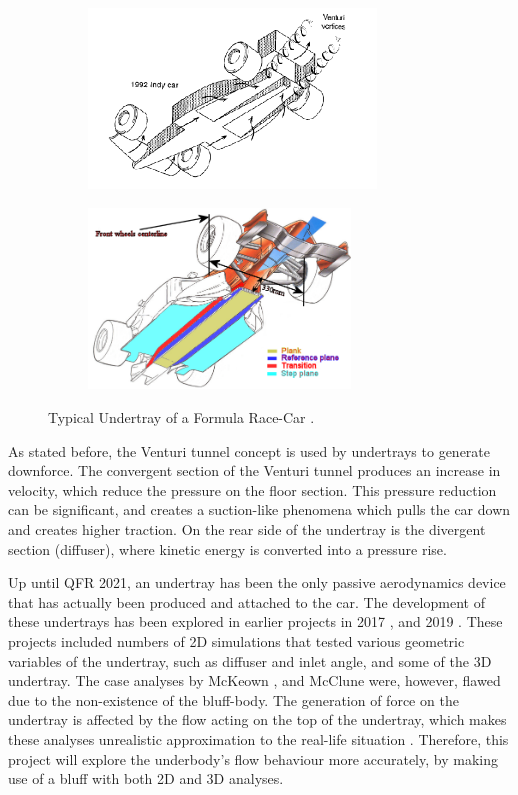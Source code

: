 \begin{figure}[!ht]
\begin{center}
%    
  \begin{subfigure}[b]{0.4\textwidth}
    \includegraphics[height=4.8cm]{Figures/underbody.PNG}
  \end{subfigure}
  \begin{subfigure}[b]{0.4\textwidth}
    \includegraphics[height=4.8cm]{Figures/undertray_f1.png}
  \end{subfigure}
%  
  \caption{Typical Undertray of a Formula Race-Car \cite{Katz1995RaceSpeed}\cite{AnonymousUndertrayUnderbody}.}
    \label{fig:underbody}
\end{center}
\end{figure}

\noindent As stated before, the Venturi tunnel concept is used by undertrays to generate downforce. The convergent section of the Venturi tunnel produces an increase in velocity, which reduce the pressure on the floor section. This pressure reduction can be significant, and creates a suction-like phenomena which pulls the car down and creates higher traction. On the rear side of the undertray is the divergent section (diffuser), where kinetic energy is converted into a pressure rise. 

\noindent Up until QFR 2021, an undertray has been the only passive aerodynamics device that has actually been produced and attached to the car. The development of these undertrays has been explored in earlier projects in 2017 \cite{McKeown2018DesignCar}, and 2019 \cite{McClune2018DesignCar}. These projects included numbers of 2D simulations that tested various geometric variables of the undertray, such as diffuser and inlet angle, and some of the 3D undertray. The case analyses by McKeown \cite{McKeown2018DesignCar}, and McClune \cite{McClune2018DesignCar} were, however, flawed due to the non-existence of the bluff-body. The generation of force on the undertray is affected by the flow acting on the top of the undertray, which makes these analyses unrealistic approximation to the real-life situation \cite{Corr2017MechanicalAuthor}. Therefore, this project will explore the underbody's flow behaviour more accurately, by making use of a bluff with both 2D and 3D analyses. 


